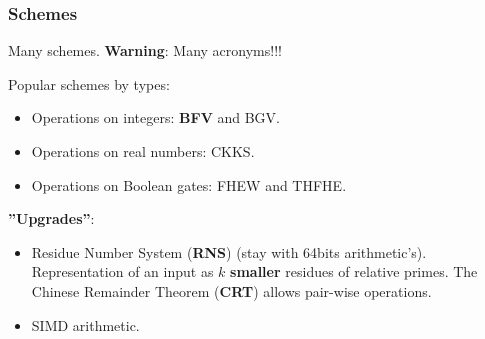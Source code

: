 \documentclass[10pt]{beamer}
\begin{document}
\begin{frame}
    \frametitle{Schemes}

    Many schemes. \textbf{Warning}: Many acronyms!!!

    Popular schemes by types:
    \begin{itemize}\vspace{-0.2cm}
        \item Operations on integers: \textbf{BFV} and BGV.\vspace{-0.2cm}
\pause
        \item Operations on real numbers: CKKS.\vspace{-0.2cm}
        \item Operations on Boolean gates: FHEW and THFHE.
    \end{itemize}

\pause
    \textbf{''Upgrades''}:
\begin{itemize}\vspace{-0.2cm}
    \item Residue Number System (\textbf{RNS}) (stay with 64bits arithmetic's).
        Representation of an input as $k$ \textbf{smaller}  residues of relative primes.
        The Chinese Remainder Theorem (\textbf{CRT}) allows pair-wise operations.
 \vspace{-0.2cm}
\pause
   \item SIMD arithmetic.
\end{itemize}


\end{frame}

\end{document}
